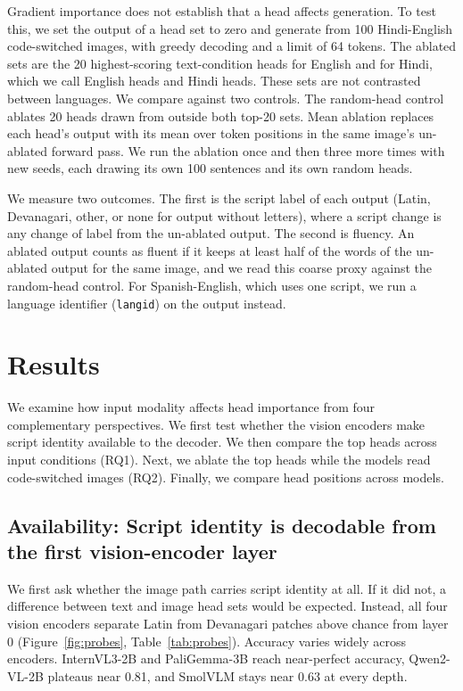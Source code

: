 \documentclass[10pt]{article}
\begin{document}
Gradient importance does not establish that a head affects generation. To test this, we set the output of a head set to zero and generate from 100 Hindi-English code-switched images, with greedy decoding and a limit of 64 tokens. The ablated sets are the 20 highest-scoring text-condition heads for English and for Hindi, which we call English heads and Hindi heads. These sets are not contrasted between languages. We compare against two controls. The random-head control ablates 20 heads drawn from outside both top-20 sets. Mean ablation replaces each head's output with its mean over token positions in the same image's un-ablated forward pass. We run the ablation once and then three more times with new seeds, each drawing its own 100 sentences and its own random heads.

We measure two outcomes. The first is the script label of each output (Latin, Devanagari, other, or none for output without letters), where a script change is any change of label from the un-ablated output. The second is fluency. An ablated output counts as fluent if it keeps at least half of the words of the un-ablated output for the same image, and we read this coarse proxy against the random-head control. For Spanish-English, which uses one script, we run a language identifier (\texttt{langid}) on the output instead.

\section{Results}
\label{sec:results}

We examine how input modality affects head importance from four complementary perspectives. We first test whether the vision encoders make script identity available to the decoder. We then compare the top heads across input conditions (RQ1). Next, we ablate the top heads while the models read code-switched images (RQ2). Finally, we compare head positions across models.

\subsection{Availability: Script identity is decodable from the first vision-encoder layer}
\label{sec:probes}

We first ask whether the image path carries script identity at all. If it did not, a difference between text and image head sets would be expected. Instead, all four vision encoders separate Latin from Devanagari patches above chance from layer 0 (Figure~\ref{fig:probes}, Table~\ref{tab:probes}). Accuracy varies widely across encoders. InternVL3-2B and PaliGemma-3B reach near-perfect accuracy, Qwen2-VL-2B plateaus near 0.81, and SmolVLM stays near 0.63 at every depth.
\end{document}
